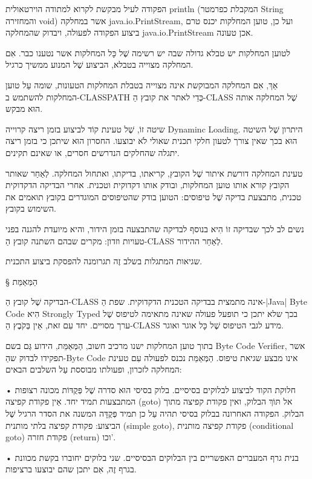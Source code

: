 הפקודה לעיל מבקשת לקרוא למתודה הוירטאולית println (המקבלת כפרמטר String
והמחזירה void) אשר במחלקה java.io.PrintStream, ועל כן, טוען המחלקות
יכנס טרם ביצוע הפקודה לפעולה, ויבדוק שהמחלקה java.io.PrintStream אכן טעונה.

לטוען המחלקות יש טבלא גדולה שבה יש רשימה שֶׁל כָּל המחלקות
אשר נטענו כבר. אִם המחלקה מצוייה בטבלא, הביצוע שֶׁל המנוע ממשיך כרגיל.

אַךְ, אִם המחלקה המבוקשת אינה מצוייה בטבלת המחלקות הטעונות, שומה עַל
טוען המחלקות להשתמש ב-CLASSPATH כְּדֵי לאתר את קובץ הַ-CLASS שֶׁל
המחלקה אותה הוּא מבקש.

שיטה זוֹ, שֶׁל טעינת קוֹד לביצוע בזמן ריצה קרוייה Dynaminc Loading. היתרון שֶׁל השיטה
הוּא בכך שאין צורך לטעון חלקי תכנית שאולי לֹא יבוצעו. החסרון הוּא שיתכן כי בזמן
ריצה יתגלה שהחלקים הנדרשים חסרים, או שאינם תקינים.

טעינת המחלקה דורשת איתור שֶׁל הקובץ, קריאתו, בדיקתו, ואתחול המחלקה. לְאַחַר שאותר
הקובץ קורא אותו טוען המחלקות, ובודק אותו דקדוקית וטכנית. אחרי הבדיקה הדקדוקית
טכנית, מתבצעת בדיקה שֶׁל טיפוסים: הטוען בודק שהטיפוסים המוגדרים בקובץ תואמים את
השימוש בקובץ.

נשים לב לכך שבדיקה זוֹ הִיא בנוסף לבדיקה שהתבצעה בזמן הידור, והיא מיועדת להגנה
בפני טעויות וזדון: מקרים שבהם השתנה קובץ הַ-CLASS לְאַחַר ההידור.

שגיאות המתגלות בשלב זֶה תגרומנה להפסקת ביצוע התכנית.

§ הַמְּאַמֵּת

הבדיקה שֶׁל קובץ הַ-CLASS אינה מתמצית בבדיקה הטכנית הדקדוקית. שפת הַ-|Java| Byte
Code הִיא Strongly Typed בכך שלא יתכן כי תופעל פעולה שאינה מתאימה לטיפוס שֶׁל
ערך מסויים. יחד עִם זאת, אֵין בְּקֹבֶץ הַ-CLASS מידע לגבי הטיפוס שֶׁל כָּל אוגר
ואוגר.

בתוך טוען המחלקות ישנו מרכיב חשוב, הַמְּאַמֵּת, הידוע גַּם בשם Byte Code
Verifier, אשר תפקידו לבדוק שהַ-Byte Code אינו מבצע שגיאת טיפוס. הַמְּאַמֵּת
נכנס לפעולה עִם טעינת המחלקה לזכרון, ופעולתו מבוססת עַל השלבים הבאים:

• חלוקת הקוד לביצוע לבלוקים בסיסיים. בלוק בסיסי הוּא סדרה שֶׁל פְּקֻדּוֹת
מכונה רצופות המתבצעות תמיד יחד. אֵין פקודת קפיצה (goto) אל תּוֹךְ הבלוק,
ואין פקודת קפיצה מתוך הבלוק. הפקודה האחרונה בבלוק בסיסי תהיה עַל כן
תמיד פְּקֻדָּה המשנה את הסדר הרגיל שֶׁל הביצוע: פקודת קפיצה בלתי מותנית
(simple goto), פקודת קפיצה מותנית (conditional goto) פקודת חזרה
(return) וכו'.

• בנית גרף המעברים האפשריים בין הבלוקים הבסיסיים. שני בלוקים יחוברו בקשת מכוונת
בגרף זֶה, אִם יתכן שהם יבוצעו ברציפות.

